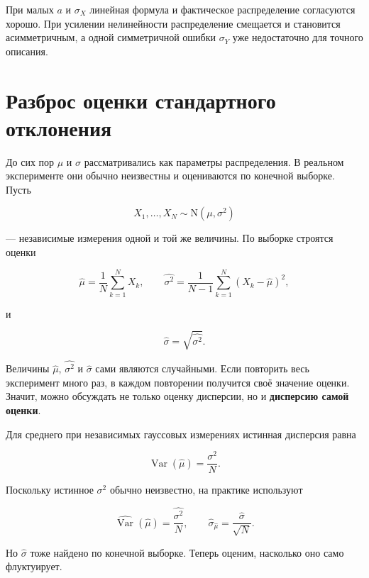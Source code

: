 \documentclass[
  russian,
  12pt,
  a4paper,
  a4paper,
  openany]{scrbook}
\begin{document}
При малых \(a\) и \(\sigma_X\) линейная формула и фактическое
распределение согласуются хорошо. При усилении нелинейности
распределение смещается и становится асимметричным, а одной симметричной
ошибки \(\sigma_Y\) уже недостаточно для точного описания.

\section{Разброс оценки стандартного
отклонения}\label{ux440ux430ux437ux431ux440ux43eux441-ux43eux446ux435ux43dux43aux438-ux441ux442ux430ux43dux434ux430ux440ux442ux43dux43eux433ux43e-ux43eux442ux43aux43bux43eux43dux435ux43dux438ux44f}

До сих пор \(\mu\) и \(\sigma\) рассматривались как параметры
распределения. В реальном эксперименте они обычно неизвестны и
оцениваются по конечной выборке. Пусть

\[
X_1,\ldots,X_N\sim\mathrm N(\mu,\sigma^2)
\]

--- независимые измерения одной и той же величины. По выборке строятся
оценки

\[
\widehat\mu
=
\frac1N\sum_{k=1}^{N}X_k,
\qquad
\widehat{\sigma^2}
=
\frac{1}{N-1}\sum_{k=1}^{N}(X_k-\widehat\mu)^2,
\]

и

\[
\widehat\sigma=\sqrt{\widehat{\sigma^2}}.
\]

\begin{booknote}

Величины \(\widehat\mu\), \(\widehat{\sigma^2}\) и \(\widehat\sigma\)
сами являются случайными. Если повторить весь эксперимент много раз, в
каждом повторении получится своё значение оценки. Значит, можно
обсуждать не только оценку дисперсии, но и \textbf{дисперсию самой
оценки}.

\end{booknote}

Для среднего при независимых гауссовых измерениях истинная дисперсия
равна

\[
\operatorname{Var}(\widehat\mu)=\frac{\sigma^2}{N}.
\]

Поскольку истинное \(\sigma^2\) обычно неизвестно, на практике
используют

\[
\widehat{\operatorname{Var}}(\widehat\mu)
=
\frac{\widehat{\sigma^2}}{N},
\qquad
\widehat\sigma_{\widehat\mu}
=
\frac{\widehat\sigma}{\sqrt N}.
\]

Но \(\widehat\sigma\) тоже найдено по конечной выборке. Теперь оценим,
насколько оно само флуктуирует.
\end{document}
